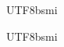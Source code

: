 \documentclass[12pt,a4paper]{report}
\theoremstyle{definition}
\begin{document}
\begin{CJK}{UTF8}{bsmi}
\begin{CJK}{UTF8}{bsmi}
\begin{table}[H]
        \label{tab:english_cw_pw}
    \end{table}
    \end{CJK}
    
%
   
   


\end{CJK}
\end{document}
